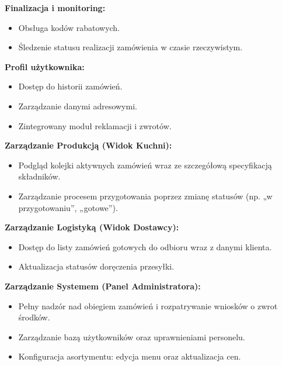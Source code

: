 \textbf{Finalizacja i monitoring:}
\begin{itemize}
\item Obsługa kodów rabatowych.
\item Śledzenie statusu realizacji zamówienia w czasie rzeczywistym.
\end{itemize}

\textbf{Profil użytkownika:}
\begin{itemize}
\item Dostęp do historii zamówień.
\item Zarządzanie danymi adresowymi.
\item Zintegrowany moduł reklamacji i zwrotów.
\end{itemize}

\textbf{Zarządzanie Produkcją (Widok Kuchni):}
\begin{itemize}
\item Podgląd kolejki aktywnych zamówień wraz ze szczegółową specyfikacją składników.
\item Zarządzanie procesem przygotowania poprzez zmianę statusów (np. „w przygotowaniu”, „gotowe”).
\end{itemize}
    
\textbf{Zarządzanie Logistyką (Widok Dostawcy):}
\begin{itemize}
\item Dostęp do listy zamówień gotowych do odbioru wraz z danymi klienta.
\item Aktualizacja statusów doręczenia przesyłki.
\end{itemize}
    
\textbf{Zarządzanie Systemem (Panel Administratora):}
\begin{itemize}
\item Pełny nadzór nad obiegiem zamówień i rozpatrywanie wniosków o zwrot środków.
\item Zarządzanie bazą użytkowników oraz uprawnieniami personelu.
\item Konfiguracja asortymentu: edycja menu oraz aktualizacja cen.
\end{itemize}


